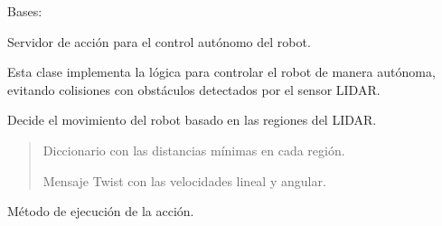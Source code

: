 \documentclass[a4paper,10pt,spanish]{sphinxmanual}
\begin{document}
\begin{fulllineitems}
\label{\detokenize{squad_autonomous_control_action:squad_autonomous_control_action.AutonomousControlActionServer}}
\pysigstartsignatures
{}
\pysigstopsignatures
\sphinxAtStartPar
Bases: 

\sphinxAtStartPar
Servidor de acción para el control autónomo del robot.

\sphinxAtStartPar
Esta clase implementa la lógica para controlar el robot de manera autónoma,
evitando colisiones con obstáculos detectados por el sensor LIDAR.

\begin{fulllineitems}
\label{\detokenize{squad_autonomous_control_action:squad_autonomous_control_action.AutonomousControlActionServer.decide_motion}}
\pysigstartsignatures
{}
\pysigstopsignatures
\sphinxAtStartPar
Decide el movimiento del robot basado en las regiones del LIDAR.
\begin{quote}\begin{description}
\sphinxAtStartPar
{} \textendash{} Diccionario con las distancias mínimas en cada región.

\sphinxAtStartPar
Mensaje Twist con las velocidades lineal y angular.

\end{description}\end{quote}

\end{fulllineitems}


\begin{fulllineitems}
\label{\detokenize{squad_autonomous_control_action:squad_autonomous_control_action.AutonomousControlActionServer.execute_cb}}
\pysigstartsignatures
{}
\pysigstopsignatures
\sphinxAtStartPar
Método de ejecución de la acción.


\end{fulllineitems}
\end{fulllineitems}
\end{document}
